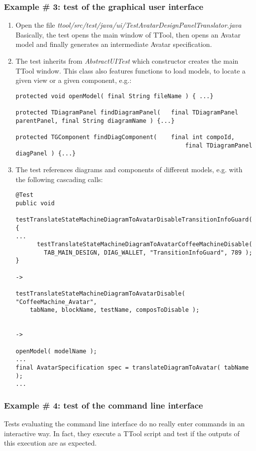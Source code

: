 \documentclass[12pt]{article}
\begin{document}
\subsubsection{Example \# 3: test of the graphical user interface}
\begin{enumerate}
\item Open the file \textit{ttool/src/test/java/ui/TestAvatarDesignPanelTranslator.java}\\
Basically, the test opens the main window of TTool,  then opens an Avatar model and finally generates an intermediate Avatar specification.

\item The test inherits from \textit{AbstractUITest} which constructor creates the main TTool window. This class also features functions to load models, to locate a given view or a given component, e.g.:

\begin{verbatim}
protected void openModel( final String fileName ) { ...}

protected TDiagramPanel findDiagramPanel( 	final TDiagramPanel 
parentPanel, final String diagramName ) {...}

protected TGComponent findDiagComponent( 	final int compoId,
												final TDiagramPanel diagPanel ) {...}
\end{verbatim}

\item The test references diagrams and components of different models, e.g. with the following cascading calls:

\begin{verbatim}
@Test
public void 
   testTranslateStateMachineDiagramToAvatarDisableTransitionInfoGuard() {
...
      testTranslateStateMachineDiagramToAvatarCoffeeMachineDisable( 
        TAB_MAIN_DESIGN, DIAG_WALLET, "TransitionInfoGuard", 789 );
}

-> 

testTranslateStateMachineDiagramToAvatarDisable( "CoffeeMachine_Avatar", 
    tabName, blockName, testName, composToDisable );


->

openModel( modelName );
...
final AvatarSpecification spec = translateDiagramToAvatar( tabName );
...
\end{verbatim}

\end{enumerate}


\subsubsection{Example \# 4: test of the command line interface}
Tests evaluating the command line interface do no really enter commands in an interactive way. In fact, they execute a TTool script and test if the outputs of this execution are as expected.
\end{document}

